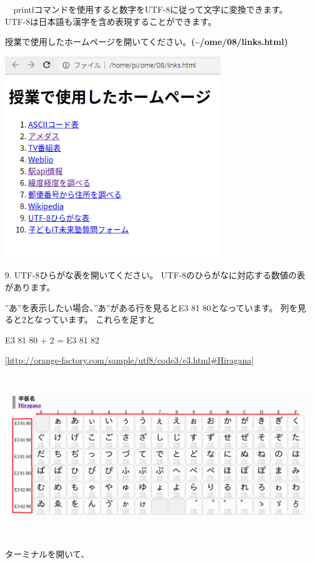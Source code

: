 \documentclass[a4paper,12pt,dvipdfmx]{jarticle}
\begin{document}
\ \ printfコマンドを使用すると数字をUTF-8に従って文字に変換できます。
UTF-8は日本語も漢字を含め表現することができます。

授業で使用したホームページを開いてください。\textbf{(\~{}/ome/08/links.html)}



\begin{center}
\includegraphics[width=9.398cm,height=8.784cm]{textbook-img017.png}

\end{center}


\bigskip


\bigskip

9.
UTF-8ひらがな表を開いてください。
UTF-8のひらがなに対応する数値の表があります。

”あ”を表示したい場合、”あ”がある行を見るとE3
81
80となっています。
列を見ると2となっています。
これらを足すと

E3 81 80 + 2 = E3 81 82

[\url{http://orange-factory.com/sample/utf8/code3/e3.html#Hiragana}]

\begin{center}
\includegraphics[width=17.006cm,height=7.049cm]{textbook-img018.png}

\end{center}
ターミナルを開いて、
\end{document}
